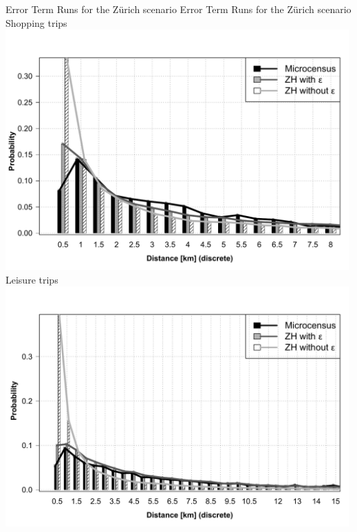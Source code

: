 \createfigure%
{Error Term Runs for the Zürich scenario}%
{Error Term Runs for the Zürich scenario}%
{\label{fig:zhLEGO}}%
{%
  \createsubfigure%
  {Shopping trips}%
	{\includegraphics[width=0.99\textwidth,angle=0]{extending/figures/dc/zhShopping.pdf}}%
  {\label{fig:zhShopping}}%
  {}%
   \createsubfigure%
  {Leisure trips}%
  {\includegraphics[width=0.99\textwidth,angle=0]{extending/figures/dc//zhLeisure.pdf}}%
  {\label{fig:zhLeisure}}%
  {}%
}%
{}

